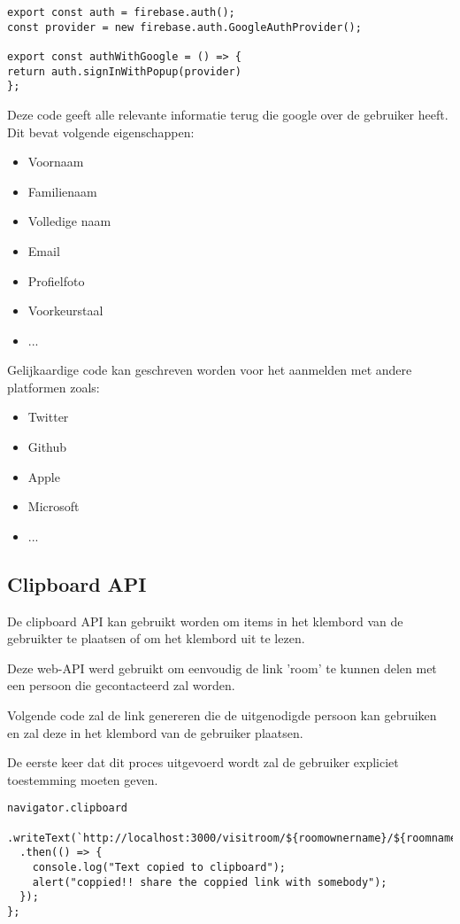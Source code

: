 		
		
\begin{lstlisting}
export const auth = firebase.auth();
const provider = new firebase.auth.GoogleAuthProvider();

export const authWithGoogle = () => {
return auth.signInWithPopup(provider)
};
\end{lstlisting}
	
		Deze code geeft alle relevante informatie terug die google over de gebruiker heeft. Dit bevat volgende eigenschappen:
		\begin{itemize}
			\item Voornaam
			\item Familienaam
			\item Volledige naam
			\item Email
			\item Profielfoto
			\item Voorkeurstaal
			\item ...
		\end{itemize} 
		
		Gelijkaardige code kan geschreven worden voor het aanmelden met andere platformen zoals:
		\begin{itemize}
			\item Twitter
			\item Github
			\item Apple
			\item Microsoft
			\item ...
		\end{itemize} 
		
	\subsection{Clipboard API}
	
		De clipboard API kan gebruikt worden om items in het klembord van de gebruikter te plaatsen of om het klembord uit te lezen.
		
		Deze web-API werd gebruikt om eenvoudig de link 'room' te kunnen delen met een persoon die gecontacteerd zal worden.
		
		Volgende code zal de link genereren die de uitgenodigde persoon kan gebruiken en zal deze in het klembord van de gebruiker plaatsen.
		
		De eerste keer dat dit proces uitgevoerd wordt zal de gebruiker expliciet toestemming moeten geven.

\begin{lstlisting}
navigator.clipboard
  .writeText(`http://localhost:3000/visitroom/${roomownername}/${roomname}`)
  .then(() => {
    console.log("Text copied to clipboard");
    alert("coppied!! share the coppied link with somebody");
  });
};
\end{lstlisting}


